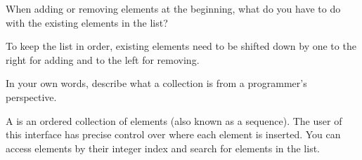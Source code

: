 \Q When adding or removing elements at the beginning, what do you have to do with the existing elements in the list?

\begin{answer}
To keep the list in order, existing elements need to be shifted down by one to the right for adding and to the left for removing.
\end{answer}


\Q In your own words, describe what a  collection is from a programmer's perspective.

\begin{answer}[5em]
A  is an ordered collection of elements (also known as a sequence).
The user of this interface has precise control over where  each element is inserted.
You can access elements by their integer index and search for elements in the list.
\end{answer}
